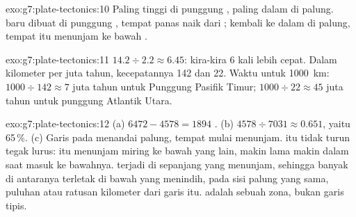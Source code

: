 \begin{solution}{exo:g7:plate-tectonics:10}
Paling tinggi di punggung , paling dalam di palung.  baru
dibuat di punggung , tempat  panas naik dari ; 
 kembali ke dalam  di palung, tempat  itu menunjam ke
bawah .
\end{solution}

\begin{solution}{exo:g7:plate-tectonics:11}
$14.2 \div 2.2 \approx 6.45$: kira-kira 6 kali lebih cepat.
Dalam kilometer per juta tahun, kecepatannya 142 dan 22. Waktu untuk
\qty{1000}{km}: $1000 \div 142 \approx 7$ juta tahun untuk Punggung
Pasifik Timur; $1000 \div 22 \approx 45$ juta tahun untuk punggung Atlantik
Utara.
\end{solution}

\begin{solution}{exo:g7:plate-tectonics:12}
(a) $6472 - 4578 = 1894$ . (b) $4578 \div 7031 \approx 0.651$,
yaitu 65\,\%. (c) Garis pada  menandai palung, tempat  
mulai menunjam.  itu tidak turun tegak lurus:  itu menunjam
miring ke bawah  yang lain, makin lama makin dalam saat masuk ke
bawahnya.  terjadi di sepanjang  yang menunjam, sehingga
banyak di antaranya terletak di bawah  yang menindih, pada sisi palung
yang sama, puluhan atau ratusan kilometer dari garis itu. 
adalah sebuah zona, bukan garis tipis.
\end{solution}

